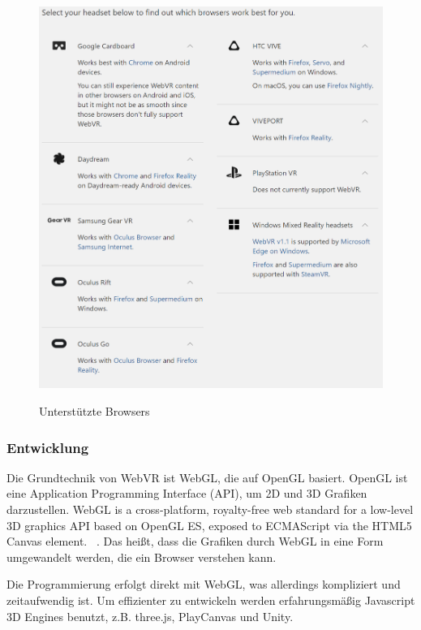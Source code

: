 \begin{figure}[ht]
\vspace*{1em}
\centering
\caption{Unterstützte Browsers}
\includegraphics[width=\textwidth]{images/supportedBrowsers.png}
\label{fig:supportedBrowsers} 
\end{figure}
 
  \subsubsection{Entwicklung}
 Die Grundtechnik von WebVR ist WebGL, die auf OpenGL basiert. OpenGL ist eine Application Programming Interface (API), um 2D und 3D Grafiken darzustellen. \glqq WebGL is a cross-platform, royalty-free web standard for a low-level 3D graphics API based on OpenGL ES, exposed to ECMAScript via the HTML5 Canvas element. \grqq\ \citep{23}. Das heißt, dass die Grafiken durch WebGL in eine Form umgewandelt werden, die ein Browser verstehen kann. 
 
 Die Programmierung erfolgt direkt mit WebGL, was allerdings kompliziert und zeitaufwendig ist. Um effizienter zu entwickeln werden erfahrungsmäßig Javascript 3D Engines benutzt, z.B. three.js, PlayCanvas und Unity.
 
